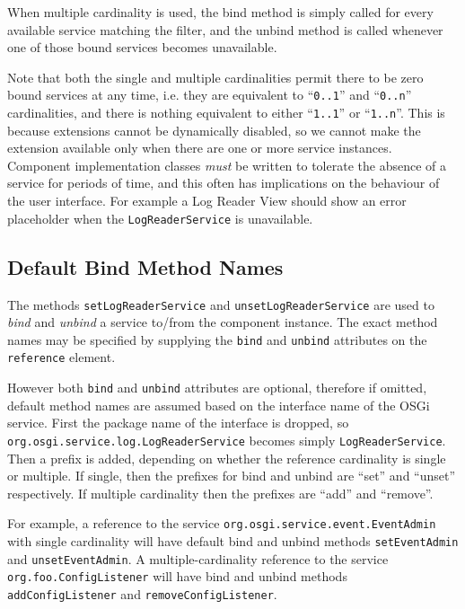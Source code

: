 \documentclass[12pt]{article}
\begin{document}
When multiple cardinality is used, the bind method is simply called for every available service matching the filter, and the unbind method is called whenever one of those bound services becomes unavailable.

Note that both the single and multiple cardinalities permit there to be zero bound services at any time, i.e. they are equivalent to ``\texttt{0..1}'' and ``\texttt{0..n}'' cardinalities, and there is nothing equivalent to either ``\texttt{1..1}'' or ``\texttt{1..n}''. This is because extensions cannot be dynamically disabled, so we cannot make the extension available only when there are one or more service instances. Component implementation classes \emph{must} be written to tolerate the absence of a service for periods of time, and this often has implications on the behaviour of the user interface. For example a Log Reader View should show an error placeholder when the \texttt{LogReaderService} is unavailable.

\subsection{Default Bind Method Names}

The methods \texttt{setLogReaderService} and \texttt{unsetLogReaderService} are used to \emph{bind} and \emph{unbind} a service to/from the component instance. The exact method names may be specified by supplying the \texttt{bind} and \texttt{unbind} attributes on the \texttt{reference} element.

However both \texttt{bind} and \texttt{unbind} attributes are optional, therefore if omitted, default method names are assumed based on the interface name of the OSGi service. First the package name of the interface is dropped, so \texttt{org.osgi.service\-.\-log\-.\-Log\-Read\-er\-Ser\-vice} becomes simply \texttt{LogReaderService}. Then a prefix is added, depending on whether the reference cardinality is single or multiple. If single, then the prefixes for bind and unbind are ``set'' and ``unset'' respectively. If multiple cardinality then the prefixes are ``add'' and ``remove''.

For example, a reference to the service \texttt{org\-.\-osgi\-.\-service\-.\-event\-.\-Event\-Admin} with single cardinality will have default bind and unbind methods \texttt{set\-Event\-Admin} and \texttt{unset\-Event\-Admin}. A multiple-cardinality reference to the service \texttt{org\-.\-foo\-.\-Config\-List\-ener} will have bind and unbind methods \texttt{add\-Config\-List\-ener} and \texttt{remove\-Con\-fig\-List\-ener}.
\end{document}
